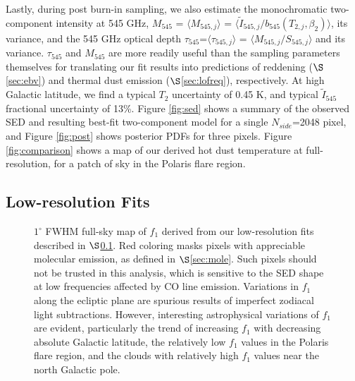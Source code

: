 \documentclass{emulateapj}
\begin{document}
Lastly, during post burn-in sampling, we also estimate the monochromatic 
two-component intensity at 545 GHz, $M_{545}$ = $\langle M_{545, j} \rangle$ = 
$\langle \tilde{I}_{545, j}/b_{545}(T_{2,j}, \beta_2) \rangle$, its variance, 
and the 545 GHz optical depth $\tau_{545}$=$\langle \tau_{545, j} \rangle$ = 
$\langle M_{545, j}/S_{545, j} \rangle$ and its variance. $\tau_{545}$ and 
$M_{545}$ are more readily useful than the sampling parameters themselves for 
translating our fit results into predictions of reddening ($\S$\ref{sec:ebv}) 
and thermal dust emission ($\S$\ref{sec:lofreq}), respectively. At high 
Galactic latitude, we find a typical $T_2$ uncertainty of 0.45 K, and typical 
$\tilde{I}_{545}$ fractional uncertainty of 13\%. Figure \ref{fig:sed} shows a 
summary of the observed SED and resulting best-fit two-component model for a 
single $N_{side}$=2048 pixel, and Figure \ref{fig:post} shows posterior PDFs 
for three pixels. Figure \ref{fig:comparison} shows a map of our derived hot 
dust temperature at full-resolution, for a patch of sky in the Polaris flare 
region.

\subsection{Low-resolution Fits}
\label{sec:lores}

\begin{figure}
\begin{center}
\caption{\label{fig:f1} $1^{\circ}$ FWHM full-sky map of $f_1$ derived from our
low-resolution fits described in $\S$\ref{sec:lores}. Red coloring masks pixels
with appreciable molecular emission, as defined in $\S$\ref{sec:mole}. Such 
pixels should not be trusted in this analysis, which is sensitive to the SED 
shape at low frequencies affected by CO line emission. Variations in $f_1$
along the ecliptic plane are spurious results of imperfect zodiacal light
subtractions. However, interesting astrophysical variations of $f_1$ 
are evident, particularly the trend of increasing $f_1$ with decreasing 
absolute Galactic latitude, the relatively low $f_1$ values in the Polaris 
flare region, and the clouds with relatively high $f_1$ values near the north 
Galactic pole.}
\end{center}
\end{figure}
\end{document}
